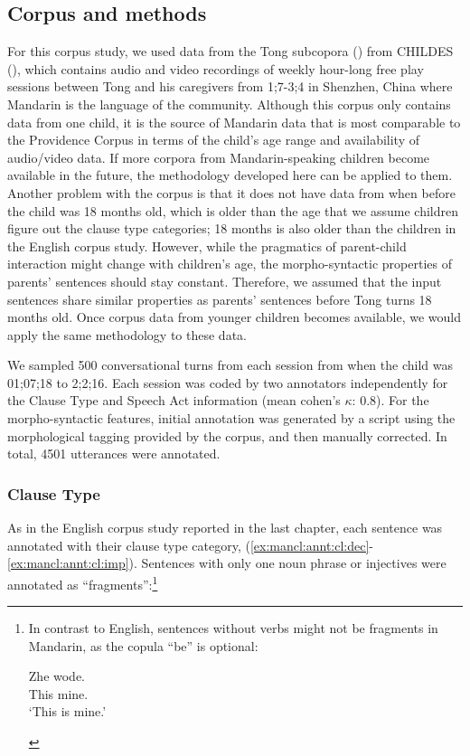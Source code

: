 \subsection{Corpus and methods}
\label{sec:mancl:corpus:method}
For this corpus study, we used data from the Tong subcopora (\cite{TongCorpus}) from CHILDES (\cite{CHILDES}), which contains audio and video recordings of weekly hour-long free play sessions between Tong and his caregivers from 1;7-3;4 in Shenzhen, China where Mandarin is the language of the community. Although this corpus only contains data from one child, it is the source of Mandarin data that is most comparable to the Providence Corpus in terms of the child's age range and availability of audio/video data. If more corpora from Mandarin-speaking children become available in the future, the methodology developed here can be applied to them. Another problem with the corpus is that it does not have data from when before the child was 18 months old, which is older than the age that we assume children figure out the clause type categories; 18 months is also older than the children in the English corpus study. However, while the pragmatics of parent-child interaction might change with children's age, the morpho-syntactic properties of parents' sentences should stay constant. Therefore, we assumed that the input sentences share similar properties as parents' sentences before Tong turns 18 months old. Once corpus data from younger children becomes available, we would apply the same methodology to these data. 

We sampled 500 conversational turns from each session from when the child was 01;07;18 to 2;2;16. Each session was coded by two annotators independently for the Clause Type and Speech Act information (mean cohen's $\kappa$: 0.8). For the morpho-syntactic features, initial annotation was generated by a script using the morphological tagging provided by the corpus, and then manually corrected. In total, 4501 utterances were annotated. 

\subsubsection{Clause Type}

As in the English corpus study reported in the last chapter, each sentence was annotated with their clause type category, \diis{} (\ref{ex:mancl:annt:cl:dec}-\ref{ex:mancl:annt:cl:imp}). Sentences with only one noun phrase or injectives were annotated as ``fragments'':\footnote{In contrast to English, sentences without verbs might not be fragments in Mandarin, as the copula  ``be'' is optional:
\begin{xlist}
\ex 
\gll Zhe wode.\\
This mine.\\
\trans `This is mine.'
\end{xlist}
}


